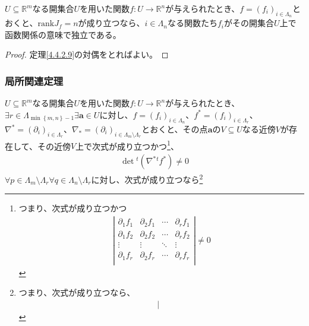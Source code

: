 \documentclass[dvipdfmx]{jsarticle}
\begin{document}
\begin{thm}\label{4.4.2.10}
$U \subseteq \mathbb{R}^{m}$なる開集合$U$を用いた関数$f:U \rightarrow \mathbb{R}^{n}$が与えられたとき、$f = \left( f_{i} \right)_{i \in \varLambda_{n}}$とおくと、$\mathrm{rank}J_{f} = n$が成り立つなら、$i \in \varLambda_{n}$なる関数たち$f_{i}$がその開集合$U$上で函数関係の意味で独立である。
\end{thm}
\begin{proof} 定理\ref{4.4.2.9}の対偶をとればよい。
\end{proof}
\subsubsection{局所関連定理}%
\begin{thm}\label{4.4.2.11}
$U \subseteq \mathbb{R}^{m}$なる開集合$U$を用いた関数$f:U \rightarrow \mathbb{R}^{n}$が与えられたとき、$\exists r \in \varLambda_{\min\left\{ m,n \right\} - 1}\exists\mathbf{a} \in U$に対し、$f = \left( f_{i} \right)_{i \in \varLambda_{n}}$、$f^{*} = \left( f_{i} \right)_{i \in \varLambda_{r}}$、$\nabla^{*} = \left( \partial_{i} \right)_{i \in \varLambda_{r}}$、$\nabla_{*} = \left( \partial_{i} \right)_{i \in \varLambda_{m} \setminus \varLambda_{r}}$とおくと、その点$\mathbf{a}$の$V \subseteq U$なる近傍$V$が存在して、その近傍$V$上で次式が成り立つかつ\footnote{つまり、次式が成り立つかつ
\begin{align*}
\left| \begin{matrix}
\partial_{1}f_{1} & \partial_{2}f_{1} & \cdots & \partial_{r}f_{1} \\
\partial_{1}f_{2} & \partial_{2}f_{2} & \cdots & \partial_{r}f_{2} \\
 \vdots & \vdots & \ddots & \vdots \\
\partial_{1}f_{r} & \partial_{2}f_{r} & \cdots & \partial_{r}f_{r} \\
\end{matrix} \right| \neq 0
\end{align*}}、
\begin{align*}
\det{{}^{t}\left( \nabla^{*}{}^{t}f^{*} \right)} \neq 0
\end{align*}
$\forall p \in \varLambda_{m} \setminus \varLambda_{r}\forall q \in \varLambda_{n} \setminus \varLambda_{r}$に対し、次式が成り立つなら\footnote{つまり、次式が成り立つなら、
\begin{align*}
  \left| \begin{matrix}

\end{matrix}
\end{align*}}
\end{thm}
\end{document}
